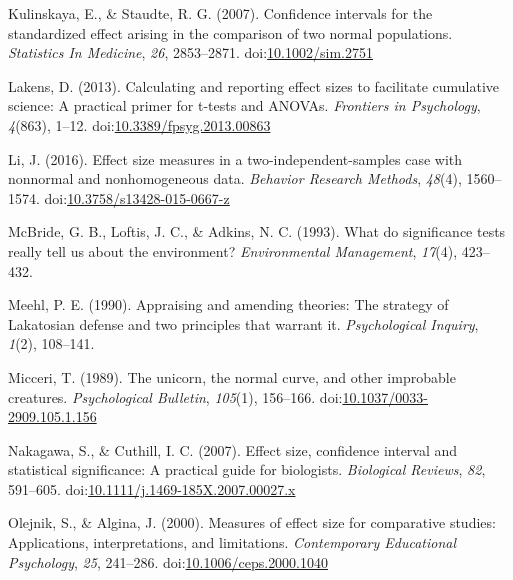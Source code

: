 \documentclass[
  man,floatsintext]{apa6}
\begin{document}
\leavevmode\hypertarget{ref-Kulinskaya_Staudte_2007}{}%
Kulinskaya, E., \& Staudte, R. G. (2007). Confidence intervals for the standardized effect arising in the comparison of two normal populations. \emph{Statistics In Medicine}, \emph{26}, 2853--2871. doi:\href{https://doi.org/10.1002/sim.2751}{10.1002/sim.2751}

\leavevmode\hypertarget{ref-Lakens_2013}{}%
Lakens, D. (2013). Calculating and reporting effect sizes to facilitate cumulative science: A practical primer for t-tests and ANOVAs. \emph{Frontiers in Psychology}, \emph{4}(863), 1--12. doi:\href{https://doi.org/10.3389/fpsyg.2013.00863}{10.3389/fpsyg.2013.00863}

\leavevmode\hypertarget{ref-Li_2016}{}%
Li, J. (2016). Effect size measures in a two-independent-samples case with nonnormal and nonhomogeneous data. \emph{Behavior Research Methods}, \emph{48}(4), 1560--1574. doi:\href{https://doi.org/10.3758/s13428-015-0667-z}{10.3758/s13428-015-0667-z}

\leavevmode\hypertarget{ref-McBride_et_al_1993}{}%
McBride, G. B., Loftis, J. C., \& Adkins, N. C. (1993). What do significance tests really tell us about the environment? \emph{Environmental Management}, \emph{17}(4), 423--432.

\leavevmode\hypertarget{ref-Meehl_1990}{}%
Meehl, P. E. (1990). Appraising and amending theories: The strategy of Lakatosian defense and two principles that warrant it. \emph{Psychological Inquiry}, \emph{1}(2), 108--141.

\leavevmode\hypertarget{ref-Micceri_1989}{}%
Micceri, T. (1989). The unicorn, the normal curve, and other improbable creatures. \emph{Psychological Bulletin}, \emph{105}(1), 156--166. doi:\href{https://doi.org/10.1037/0033-2909.105.1.156}{10.1037/0033-2909.105.1.156}

\leavevmode\hypertarget{ref-Nakagawa_and_Cuthill_2007}{}%
Nakagawa, S., \& Cuthill, I. C. (2007). Effect size, confidence interval and statistical significance: A practical guide for biologists. \emph{Biological Reviews}, \emph{82}, 591--605. doi:\href{https://doi.org/10.1111/j.1469-185X.2007.00027.x}{10.1111/j.1469-185X.2007.00027.x}

\leavevmode\hypertarget{ref-Olejnik_Algina_2000}{}%
Olejnik, S., \& Algina, J. (2000). Measures of effect size for comparative studies: Applications, interpretations, and limitations. \emph{Contemporary Educational Psychology}, \emph{25}, 241--286. doi:\href{https://doi.org/10.1006/ceps.2000.1040}{10.1006/ceps.2000.1040}
\end{document}
